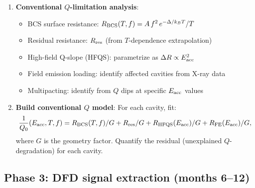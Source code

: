 \documentclass[11pt]{article}
\begin{document}
\begin{enumerate}
\item \textbf{Conventional $Q$-limitation analysis}:
  \begin{itemize}[nosep]
  \item BCS surface resistance: $R_{\rm BCS}(T, f) = A\,f^2\,e^{-\Delta/k_BT}/T$
  \item Residual resistance: $R_{\rm res}$ (from $T$-dependence extrapolation)
  \item High-field Q-slope (HFQS): parametrize as $\Delta R \propto E_{\rm acc}^2$
  \item Field emission loading: identify affected cavities from X-ray data
  \item Multipacting: identify from $Q$ dips at specific $E_{\rm acc}$ values
  \end{itemize}

\item \textbf{Build conventional $Q$ model}: For each cavity, fit:
  \begin{equation}
  \frac{1}{Q_0}(E_{\rm acc}, T, f) = R_{\rm BCS}(T, f)/G
  + R_{\rm res}/G + R_{\rm HFQS}(E_{\rm acc})/G
  + R_{\rm FE}(E_{\rm acc})/G,
  \end{equation}
  where $G$ is the geometry factor. Quantify the residual (unexplained
  $Q$-degradation) for each cavity.
\end{enumerate}

\subsection{Phase 3: DFD signal extraction (months 6--12)}
\end{document}
